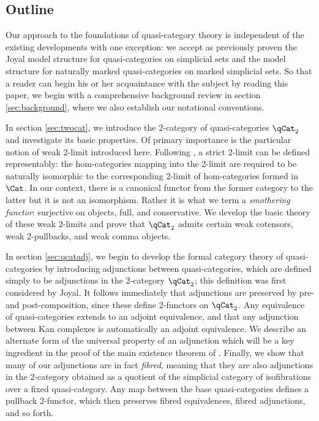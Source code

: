 \subsection{Outline}

Our approach to the foundations of quasi-category theory is independent of the existing developments with one exception: we accept as previously proven the Joyal model structure for quasi-categories on simplicial sets and the model structure for naturally marked quasi-categories on marked simplicial sets. So that a reader can begin his or her acquaintance with the subject by reading this paper, we begin with a comprehensive background review in section \ref{sec:background}, where we also establish our notational conventions. 

In section \ref{sec:twocat}, we introduce the 2-category of quasi-categories $\qCat_2$ and investigate its basic properties. Of primary importance is the particular notion of weak 2-limit introduced here. Following \cite{Kelly:1989fk}, a strict 2-limit can be defined representably: the hom-categories mapping into the 2-limit are required to be naturally isomorphic to the corresponding 2-limit of hom-categories formed in $\Cat$. In our context, there is a canonical functor from the former category to the latter but it is not an isomorphism. Rather it is what we term a {\em smothering functor}: surjective on objects, full, and conservative. We develop the basic theory of these weak 2-limits and prove that $\qCat_2$ admits certain weak cotensors, weak 2-pullbacks, and weak comma objects.

In section \ref{sec:qcatadj}, we begin to develop the formal category theory of quasi-categories by introducing adjunctions between quasi-categories, which are defined simply to be adjunctions in the 2-category $\qCat_2$; this definition was first considered by Joyal. It follows immediately that adjunctions are preserved by pre- and post-composition, since these define 2-functors on $\qCat_2$. Any equivalence of quasi-categories extends to an adjoint equivalence, and that any adjunction between Kan complexes is automatically an adjoint equivalence. We describe an alternate form of the universal property of an adjunction which will be a key ingredient in the proof of the main existence theorem of \cite{RiehlVerity:2012hc}. Finally, we show that many of our adjunctions are in fact {\em fibred}, meaning that they are also adjunctions in the 2-category obtained as a quotient of the simplicial category of isofibrations over a fixed quasi-category. Any map between the base quasi-categories defines a pullback 2-functor, which then preserves fibred equivalences, fibred adjunctions, and so forth.

